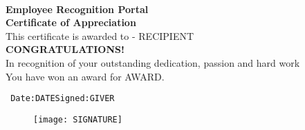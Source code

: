 \documentclass[a4paper]{article}
\begin{document}
    \pagestyle{empty}
    
    \begin{title} \\
    \begin{center}
    \textbf{{\normalsize \color{orange} Employee Recognition Portal}}\\
    \vspace{2em}
    \textbf{{\Large Certificate of Appreciation}}\\
    \vspace{2em}
    This certificate is awarded to - RECIPIENT\\
    \vspace{2em}
    \textbf{{\normalsize \color{red} CONGRATULATIONS!}}\\
    \color{black}In recognition of your outstanding dedication, passion and hard work\\
    You have won an award for \color{blue} AWARD.\\
    
    
    
    
    \end{center}
    \vspace{15em}
    
    \texttt{\noindent
    Date:DATE\hspace{35ex}Signed:GIVER}
    \end{title}
    \begin{figure}[h!]
        \texttt{[image: SIGNATURE]}
    \end{figure}
\end{document}
